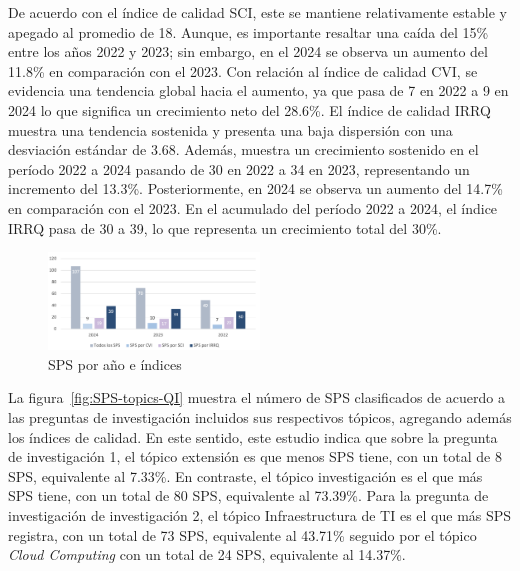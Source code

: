 De acuerdo con el índice de calidad SCI, este se mantiene relativamente estable y apegado al promedio de 18. Aunque, es importante resaltar una caída del 15\% entre los años 2022 y 2023; sin embargo, en el 2024 se observa un aumento del 11.8\% en comparación con el 2023. Con relación al índice de calidad CVI, se evidencia una tendencia global hacia el aumento, ya que pasa de 7 en 2022 a 9 en 2024 lo que significa un crecimiento neto del 28.6\%. El índice de calidad IRRQ muestra una tendencia sostenida y presenta una baja dispersión con una desviación estándar de 3.68. Además, muestra un crecimiento sostenido en el período 2022 a 2024 pasando de 30 en 2022 a 34 en 2023, representando un incremento del 13.3\%. Posteriormente, en 2024 se observa un aumento del 14.7\% en comparación con el 2023. En el acumulado del período 2022 a 2024, el índice IRRQ pasa de 30 a 39, lo que representa un crecimiento total del 30\%.\\
\begin{figure}[htbp]
    \centering
    \includegraphics[width=0.5\textwidth]{resources/images/resultados/SPS-QI.png}
    \caption{SPS por año e índices}\label{fig:SPS-QI}
\end{figure}
La figura~\ref{fig:SPS-topics-QI} muestra el número de SPS clasificados de acuerdo a las preguntas de investigación incluidos sus respectivos tópicos, agregando además los índices de calidad. En este sentido, este estudio indica que sobre la pregunta de investigación 1, el tópico extensión es que menos SPS tiene, con un total de 8 SPS, equivalente al 7.33\%. En contraste, el tópico investigación es el que más SPS tiene, con un total de 80 SPS, equivalente al 73.39\%. Para la pregunta de investigación de investigación 2, el tópico Infraestructura de TI es el que más SPS registra, con un total de 73 SPS, equivalente al 43.71\% seguido por el tópico \textit{Cloud Computing} con un total de 24 SPS, equivalente al 14.37\%. 

